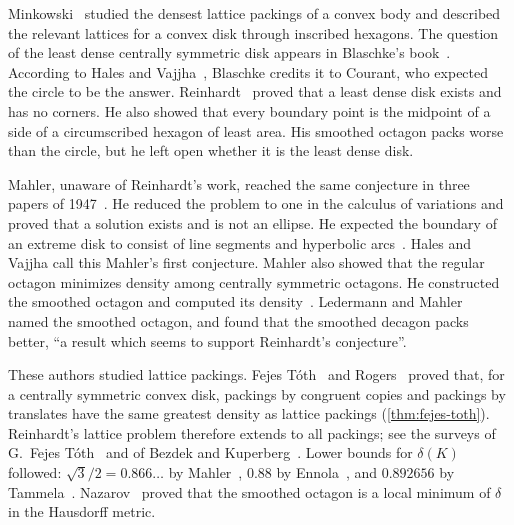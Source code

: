 Minkowski~\cite{Minkowski1904,Minkowski1907} studied the densest lattice packings of a convex
body and described the relevant lattices for a convex disk through inscribed hexagons. The
question of the least dense centrally symmetric disk appears in Blaschke's
book~\cite{Blaschke1923}. According to Hales and Vajjha~\cite[\S1.2]{HalesVajjha2024}, Blaschke
credits it to Courant, who expected the circle to be the answer. Reinhardt~\cite{Reinhardt1934}
proved that a least dense disk exists and has no corners. He also showed that every boundary
point is the midpoint of a side of a circumscribed hexagon of least area. His smoothed octagon
packs worse than the circle, but he left open whether it is the least dense disk.

Mahler, unaware of Reinhardt's work, reached the same conjecture in three papers of
1947~\cite{Mahler1947a,Mahler1947b,Mahler1947c}. He reduced the problem to one in the calculus of
variations and proved that a solution exists and is not an ellipse. He expected the boundary of an
extreme disk to consist of line segments and hyperbolic arcs~\cite[p.~117]{Mahler1947b}. Hales and
Vajjha call this Mahler's first conjecture. Mahler also showed that the regular octagon minimizes
density among centrally symmetric octagons. He constructed the smoothed octagon and computed its
density~\cite[\S12]{Mahler1947c}. Ledermann and Mahler~\cite{LedermannMahler1949} named the
smoothed octagon, and found that the smoothed decagon packs better, ``a result which seems to
support Reinhardt's conjecture''.

These authors studied lattice packings. Fejes T\'oth~\cite{FejesToth1950} and
Rogers~\cite{Rogers1951} proved that, for a centrally symmetric convex disk, packings by congruent
copies and packings by translates have the same greatest density as lattice packings
(\cref{thm:fejes-toth}). Reinhardt's lattice problem therefore extends to all packings; see the
surveys of G.~Fejes T\'oth~\cite{GFejesToth2017} and of Bezdek and
Kuperberg~\cite{BezdekKuperberg2013}. Lower bounds for $\delta(K)$ followed:
$\sqrt3/2=0.866\ldots$ by Mahler~\cite{Mahler1946}, $0.88$ by Ennola~\cite{Ennola1961}, and
$0.892656$ by Tammela~\cite{Tammela1970}. Nazarov~\cite{Nazarov1986} proved that the smoothed
octagon is a local minimum of $\delta$ in the Hausdorff metric.

